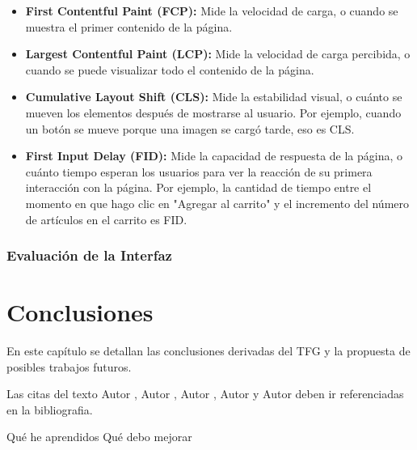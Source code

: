 \documentclass[12pt,twoside,titlepage]{report}
\newcommand\blankpage{%
    \newpage
    \null
    \thispagestyle{empty}%
    \newpage}
\begin{document}
\begin{itemize}
    \item\textbf{First Contentful Paint (FCP):} Mide la velocidad de carga, o cuando se muestra el primer contenido de la página.
    \item\textbf{Largest Contentful Paint (LCP):} Mide la velocidad de carga percibida, o cuando se puede visualizar todo el contenido de la página.
    \item\textbf{Cumulative Layout Shift (CLS):} Mide la estabilidad visual, o cuánto se mueven los elementos después de mostrarse al usuario. Por ejemplo, cuando un botón se mueve porque una imagen se cargó tarde, eso es CLS.
    \item\textbf{First Input Delay (FID):} Mide la capacidad de respuesta de la página, o cuánto tiempo esperan los usuarios para ver la reacción de su primera interacción con la página. Por ejemplo, la cantidad de tiempo entre el momento en que hago clic en "Agregar al carrito" y el incremento del número de artículos en el carrito es FID.
\end{itemize}

\subsection{Evaluación de la Interfaz}

\newpage

\chapter{Conclusiones}

En este capítulo se detallan las conclusiones derivadas del TFG y la propuesta de posibles trabajos futuros.

Las citas del texto Autor \cite{giaquinta}, Autor \cite{fortune}, Autor \cite{fortuneB}, Autor \cite{mitchell} y Autor \cite{morrey} deben ir referenciadas en la bibliografia.


Qué he aprendidos
Qué debo mejorar

\blankpage




{}
\footnotesize{
%


}
\raggedbottom
\afterpage{\blankpage}
\newpage
\end{document}
